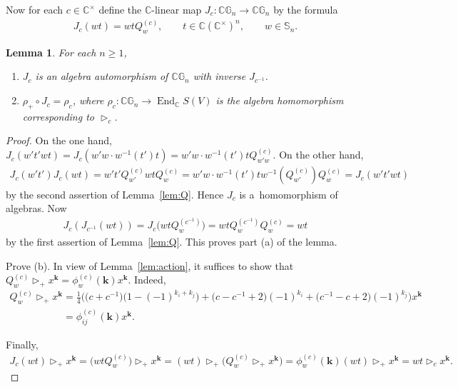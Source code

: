 \documentclass[11pt]{article}
\DeclareMathOperator{\End}{End}
\newtheorem{Lemma}[Theorem]{Lemma}
\begin{document}
Now for each $c\in\mathbb C^\times$ def\/ine the $\mathbb C$-linear map $J_c\colon \mathbb C\mathbb G_n\to \mathbb
C\mathbb G_n$ by the formula
\begin{gather*}
J_c(wt)=wtQ^{(c)}_w,
\qquad
t\in \mathbb C(\mathbb C^\times)^n,
\qquad
w\in \mathbb S_n.
\end{gather*}
\begin{Lemma}\label{lem:J_c}
For each $n\ge 1$,
\begin{enumerate}\itemsep=0pt
\item[$(a)$] $J_c$ is an algebra automorphism of $\mathbb C \mathbb G_n$ with inverse $J_{c^{-1}}$.

\item[$(b)$] $\rho_+\circ J_c=\rho_c$, where $\rho_c:\mathbb C \mathbb G_n\to \End_\mathbb C S(V)$ is the algebra homomorphism
corresponding to $\mathop{\triangleright}\nolimits_c$.
\end{enumerate}
\end{Lemma}

\begin{proof}
On the one hand, $J_c(w't'w t)=J_c(w'w\cdot w^{-1}(t')t)=w'w \cdot w^{-1}(t')tQ_{w'w}^{(c)}$.
On the other hand,
\begin{gather*}
J_c(w't')J_c(w t) = w't'Q_{w'}^{(c)} wt Q^{(c)}_w=w'w \cdot w^{-1}(t')tw^{-1}(Q_{w'}^{(c)}) Q_w^{(c)}=J_c(w't'wt)
\end{gather*}
by the second assertion of Lemma~\ref{lem:Q}.
Hence $J_c$ is a~homomorphism of algebras.
Now{\samepage
\begin{gather*}
J_c(J_{c^{-1}}(wt))=J_c\big(wtQ_w^{(c^{-1})}\big)=wtQ_w^{(c^{-1})}Q_w^{(c)}=wt
\end{gather*}
by the f\/irst assertion of Lemma~\ref{lem:Q}.
This proves part (a) of the lemma.}

Prove (b).
In view of Lemma~\ref{lem:action}, it suf\/f\/ices to show that $Q_w^{(c)}\mathop{\triangleright}\nolimits_+ x^{\mathbf
k}=\phi_w^{(c)}(\mathbf k) x^{\mathbf k}$.
Indeed,
\begin{gather*}
Q_w^{(c)}\mathop{\triangleright}\nolimits_+ x^{\mathbf k}
= \frac14 \big(\big(c+c^{-1}\big)\big(1-(-1)^{k_i+k_j}\big)+\big(c-c^{-1}+2\big)(-1)^{k_i}+\big(c^{-1}-c+2\big)(-1)^{k_j}\big)x^{\mathbf k}
\\
\phantom{Q_w^{(c)}\mathop{\triangleright}\nolimits_+ x^{\mathbf k}}
=\phi_{ij}^{(c)}(\mathbf k)x^{\mathbf k}.
\end{gather*}

Finally,
\begin{gather*}
 J_c(wt)\mathop{\triangleright}\nolimits_+ x^{\mathbf k}
=\big(wtQ_w^{(c)}\big)\mathop{\triangleright}\nolimits_+x^{\mathbf k}
=(wt)\mathop{\triangleright}\nolimits_+\big(Q_w^{(c)}\mathop{\triangleright}\nolimits_+x^{\mathbf k}\big)
=\phi_w^{(c)}(\mathbf k)(wt)\mathop{\triangleright}\nolimits_+x^{\mathbf k} =wt\mathop{\triangleright}\nolimits_c x^{\mathbf k}. \!\!\!\tag*{\qed}
\end{gather*}
\renewcommand{\qed}{}
\end{proof}
\end{document}
